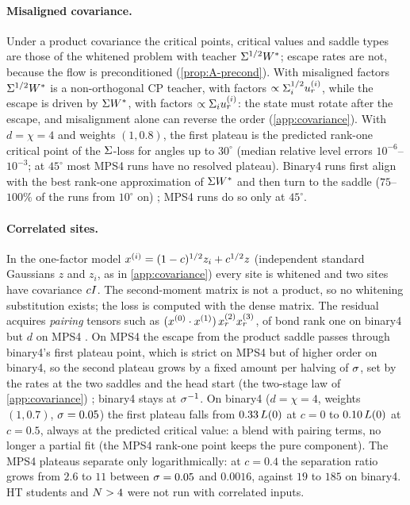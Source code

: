 \paragraph{Misaligned covariance.}
Under a product covariance the critical points, critical values and saddle types are those of the
whitened problem with teacher $\Sigma^{1/2}W^{*}$; escape rates are not, because the flow is preconditioned
\proven{}  (\cref{prop:A-precond}). With misaligned factors $\Sigma^{1/2}W^{*}$ is a
non-orthogonal CP teacher, with factors $\propto\Sigma_{i}^{1/2}u_{r}^{(i)}$, while the escape is driven by $\Sigma W^{*}$,
with factors $\propto\Sigma_{i}u_{r}^{(i)}$: the state must rotate after the escape, and misalignment alone can
reverse the order \derived{} \newresult{} (\cref{app:covariance}). \empirical{} With $d=\chi=4$ and weights $(1,0.8)$,
the first plateau is the predicted rank-one critical point of the $\Sigma$-loss for angles up to $30^\circ$ (median
relative level errors $10^{-6}$--$10^{-3}$; at $45^\circ$ most MPS4 runs have no resolved plateau). Binary4 runs
first align with the best rank-one approximation of $\Sigma W^{*}$ and then turn to the saddle ($75$--$100\%$ of the
runs from $10^\circ$ on) ; MPS4
runs do so only at $45^\circ$.

\paragraph{Correlated sites.}\label{sec:cov-correlated}
In the one-factor model $x^{(i)}=(1-c)^{1/2}z_i+c^{1/2}z$ (independent standard Gaussians $z$ and $z_i$, as in
\cref{app:covariance}) every site is whitened and two sites have covariance $cI$. The second-moment matrix
is not a product, so no whitening substitution exists; the loss is computed with the dense matrix. The
residual acquires \emph{pairing} tensors such as $(x^{(0)}\cdot x^{(1)})\,x^{(2)}_rx^{(3)}_r$, of bond rank one on binary4 but
$d$ on MPS4 \derived. On MPS4 the escape from the product saddle passes through binary4's first plateau
point, which is strict on MPS4 but of higher order on binary4, so the second plateau grows by a fixed
amount per halving of $\sigma$, set by the rates at the two saddles and the head start (the two-stage law of
\cref{app:covariance}) \derived{} \newresult; binary4 stays at $\sigma^{-1}$. \empirical{} On binary4 ($d=\chi=4$,
weights $(1,0.7)$, $\sigma=0.05$) the first plateau falls from $0.33\,L(0)$ at $c=0$ to $0.10\,L(0)$ at $c=0.5$,
always at the predicted critical value: a blend with pairing terms, no longer a partial fit (the MPS4
rank-one point keeps the pure component). The MPS4 plateaus separate only logarithmically: at $c=0.4$ the
separation ratio grows from $2.6$ to $11$ between $\sigma=0.05$ and $0.0016$, against $19$ to $185$ on binary4.
HT students and $N>4$ were not run with correlated inputs.

